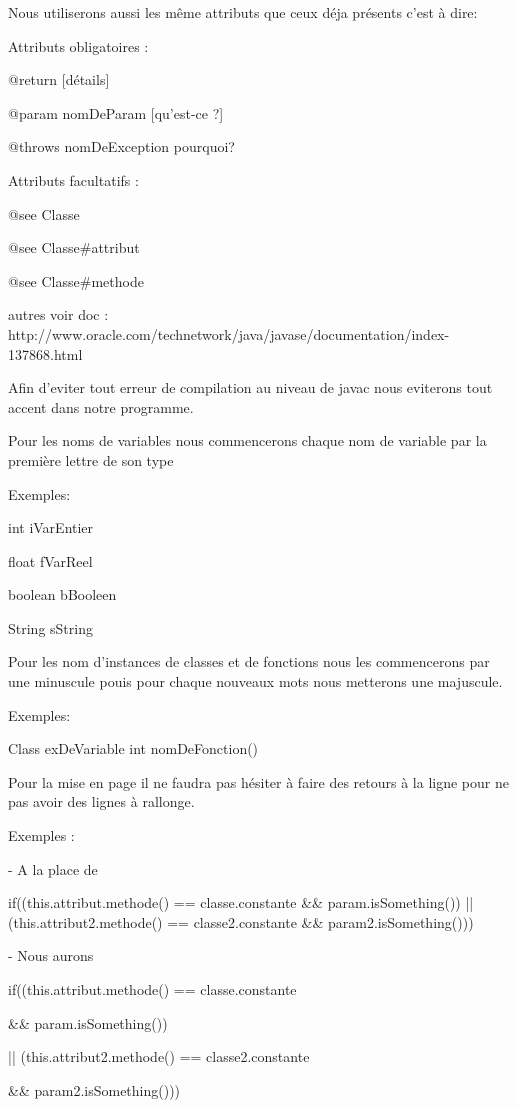 Nous utiliserons aussi les même attributs que ceux déja présents c'est à dire:

\begin{flushleft}
 Attributs obligatoires :
\end{flushleft}

    @return [détails]

    @param nomDeParam [qu'est-ce ?]

    @throws nomDeException pourquoi?

\begin{flushleft}
 Attributs facultatifs :
\end{flushleft}

    @see Classe

    @see Classe\#attribut

    @see Classe\#methode

    autres voir doc :  http://www.oracle.com/technetwork/java/javase/documentation/index-137868.html

\begin{flushleft}
 Afin d'eviter tout erreur de compilation au niveau de javac nous eviterons tout accent dans notre programme.
\end{flushleft}

\begin{flushleft}
 Pour les noms de variables nous commencerons chaque nom de variable par la première lettre de son type

 Exemples:
\end{flushleft}

   int iVarEntier 

   float fVarReel

   boolean bBooleen

   String sString

\begin{flushleft}
 Pour les nom d'instances de classes et de fonctions nous les commencerons par une minuscule pouis pour chaque nouveaux mots nous metterons une majuscule.

 Exemples:
\end{flushleft}

   Class exDeVariable
   int nomDeFonction()

\begin{flushleft}
 Pour la mise en page il ne faudra pas hésiter à faire des retours à la ligne pour ne pas avoir des lignes à rallonge.

 Exemples :

   - A la place de
\end{flushleft}

      if((this.attribut.methode() == classe.constante \&\& param.isSomething()) || (this.attribut2.methode() == classe2.constante \&\& param2.isSomething()))

\begin{flushleft}
    - Nous aurons
\end{flushleft}

      if((this.attribut.methode() == classe.constante

    	\&\& param.isSomething())

        || (this.attribut2.methode() == classe2.constante

        \&\& param2.isSomething()))
